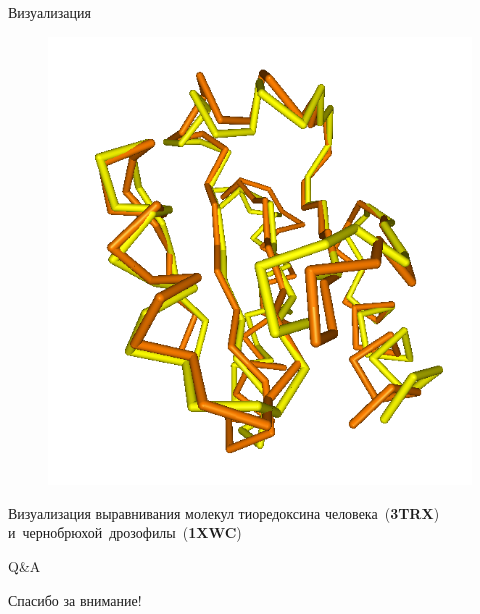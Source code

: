 \documentclass[utf8, professionalfonts]{beamer}
\begin{document}
\begin{frame}{Визуализация}
\begin{figure}[h]
    \includegraphics[width=0.5\linewidth]{alignment-3TRX-vs-1XWC}
\end{figure}

\begin{center}
\begin{small}
Визуализация выравнивания молекул тиоредоксина человека~(\textbf{3TRX}) и~чернобрюхой~дрозофилы~(\textbf{1XWC})
\end{small}
\end{center}

\end{frame}


\begin{frame}{Q\&A}
\begin{center} 
\LARGE{Спасибо за внимание!}
\end{center}
\end{frame}
\end{document}
